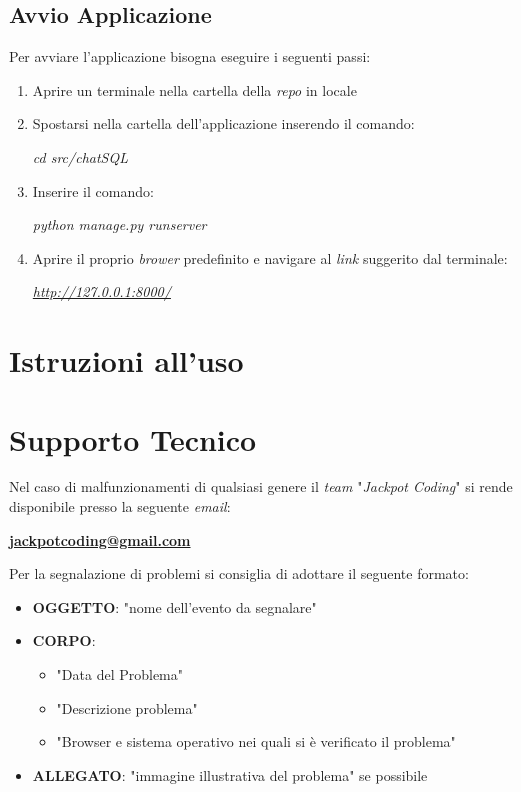\documentclass[5pt]{article}
\begin{document}
		\subsection{Avvio Applicazione}
			Per avviare l'applicazione bisogna eseguire i seguenti passi:
			\begin{enumerate}
				\item Aprire un terminale nella cartella della \textit{repo} in locale
				\item Spostarsi nella cartella dell'applicazione inserendo il comando:
					\begin{center}
						\textit{cd src/chatSQL}
					\end{center}
				\item Inserire il comando:
					\begin{center}
						\textit{python manage.py runserver}
					\end{center}
				\item Aprire il proprio \textit{brower} predefinito e navigare al \textit{link} suggerito dal terminale:
					\begin{center}
						\textit{\url{http://127.0.0.1:8000/}}
					\end{center}
			\end{enumerate}
 
    \section{Istruzioni all'uso}
        
	\section{Supporto Tecnico}
		Nel caso di malfunzionamenti di qualsiasi genere il \textit{team} "\textit{Jackpot Coding}" si rende disponibile presso la seguente \textit{email}:
		\begin{center}
			\textbf{\url{jackpotcoding@gmail.com}}
		\end{center}

		Per la segnalazione di problemi si consiglia di adottare il seguente formato:
		\begin{itemize}
			\item \textbf{OGGETTO}: "nome dell'evento da segnalare"
			\item \textbf{CORPO}:
			\begin{itemize}
				\item "Data del Problema"
				\item "Descrizione problema"
				\item "Browser e sistema operativo nei quali si è verificato il problema"
			\end{itemize}
			\item \textbf{ALLEGATO}: "immagine illustrativa del problema" se possibile
		\end{itemize}
        
\end{document}
